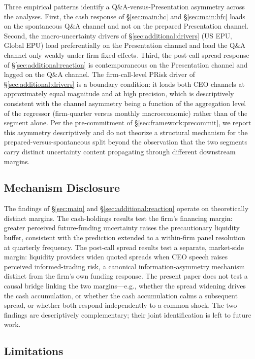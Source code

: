 Three empirical patterns identify a Q\&A-versus-Presentation asymmetry across the analyses. First, the cash response of \S\ref{sec:main:hc} and \S\ref{sec:main:hfc} loads on the spontaneous Q\&A channel and not on the prepared Presentation channel. Second, the macro-uncertainty drivers of \S\ref{sec:additional:drivers} (US EPU, Global EPU) load preferentially on the Presentation channel and load the Q\&A channel only weakly under firm fixed effects. Third, the post-call spread response of \S\ref{sec:additional:reaction} is contemporaneous on the Presentation channel and lagged on the Q\&A channel. The firm-call-level PRisk driver of \S\ref{sec:additional:drivers} is a boundary condition: it loads both CEO channels at approximately equal magnitude and at high precision, which is descriptively consistent with the channel asymmetry being a function of the aggregation level of the regressor (firm-quarter versus monthly macroeconomic) rather than of the segment alone. Per the pre-commitment of \S\ref{sec:framework:precommit}, we report this asymmetry descriptively and do not theorize a structural mechanism for the prepared-versus-spontaneous split beyond the observation that the two segments carry distinct uncertainty content propagating through different downstream margins.

\subsection{Mechanism Disclosure}

The findings of \S\ref{sec:main} and \S\ref{sec:additional:reaction} operate on theoretically distinct margins. The cash-holdings results test the firm's financing margin: greater perceived future-funding uncertainty raises the precautionary liquidity buffer, consistent with the  prediction extended to a within-firm panel resolution at quarterly frequency. The post-call spread results test a separate, market-side margin: liquidity providers widen quoted spreads when CEO speech raises perceived informed-trading risk, a canonical information-asymmetry mechanism distinct from the firm's own funding response. The present paper does not test a causal bridge linking the two margins---e.g., whether the spread widening drives the cash accumulation, or whether the cash accumulation calms a subsequent spread, or whether both respond independently to a common shock. The two findings are descriptively complementary; their joint identification is left to future work.

\subsection{Limitations}

